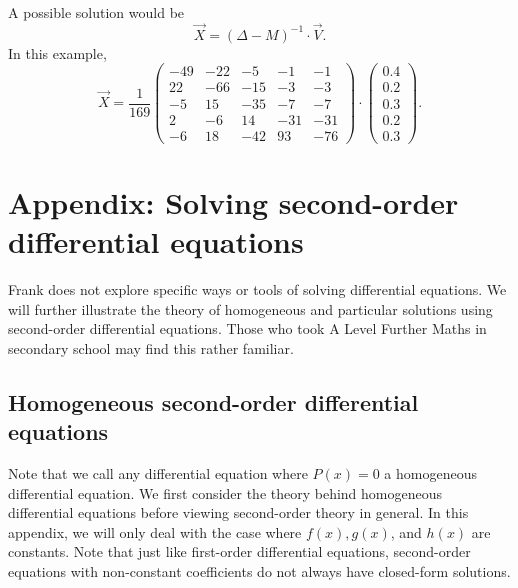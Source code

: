 \documentclass[a4paper, 12pt,oneside,openany]{book}
\begin{document}
{A possible solution would be $$\vec{X} = (\Delta-M)^{-1} \cdot \vec{V}.$$ In this example, $$\vec{X} = \frac{1}{169} \begin{pmatrix}  -49 & -22 & -5 & -1 & -1 \\ 22 & -66 & -15 & -3 & -3 \\ -5&15&-35&-7&-7 \\ 2&-6&14&-31&-31 \\ -6&18&-42&93&-76\end{pmatrix} \cdot  \begin{pmatrix} 0.4\\0.2\\0.3\\0.2\\0.3 \end{pmatrix}.$$
}


\section{Appendix: Solving second-order differential equations}


Frank does not explore specific ways or tools of solving differential equations. We will further illustrate the theory of homogeneous and particular solutions using second-order differential equations. Those who took A Level Further Maths in secondary school may find this rather familiar. 

\subsection{Homogeneous second-order differential equations}


Note that we call any differential equation where $P(x)=0$ a homogeneous differential equation. We first consider the theory behind homogeneous differential equations before viewing second-order theory in general. In this appendix, we will only deal with the case where $f(x), g(x)$, and $h(x)$ are constants. Note that just like first-order differential equations, second-order equations with non-constant coefficients do not always have closed-form solutions. 
\end{document}
